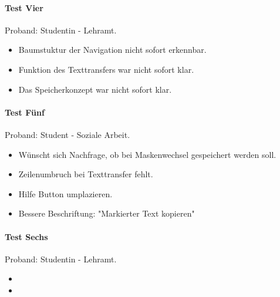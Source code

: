 \paragraph*{Test Vier}
Proband: Studentin - Lehramt.
\begin{itemize}
	\item Baumstuktur der Navigation nicht sofort erkennbar.
	\item Funktion des Texttransfers war nicht sofort klar.
	\item Das Speicherkonzept war nicht sofort klar.
\end{itemize}

\paragraph*{Test Fünf}
Proband: Student - Soziale Arbeit. 
\begin{itemize}
	\item Wünscht sich Nachfrage, ob bei Maskenwechsel gespeichert werden soll. 
	\item Zeilenumbruch bei Texttransfer fehlt. 
	\item Hilfe Button umplazieren.
	\item Bessere Beschriftung: "Markierter Text kopieren"
\end{itemize}

\paragraph*{Test Sechs}
Proband: Studentin - Lehramt. 
\begin{itemize}
	\item  
	\item 
\end{itemize}
